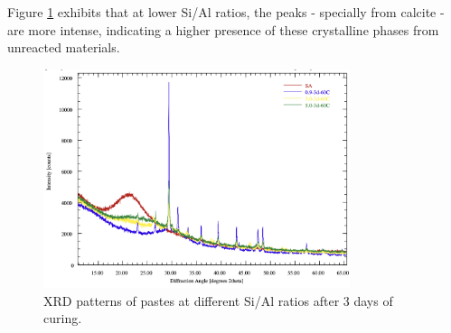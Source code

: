 Figure \ref{fig:xrd_pastes} exhibits that at lower Si/Al ratios, the peaks - specially from calcite - are more intense, indicating a higher presence of these crystalline phases from unreacted materials.


\begin{figure}[H]
    \centering
    \includegraphics[width=0.8\textwidth]{Cap4/xrd_pastes.png}
    \caption{XRD patterns of pastes at different Si/Al ratios after 3 days of curing.}
    \label{fig:xrd_pastes}
\end{figure}
